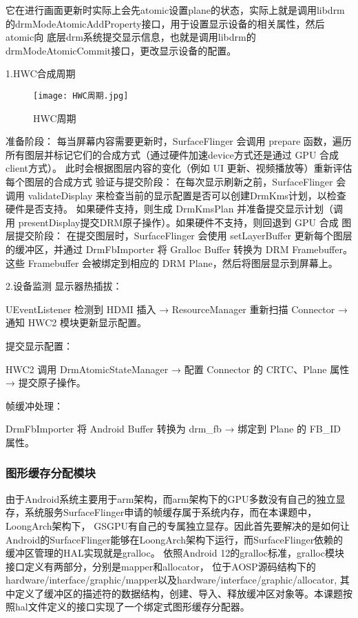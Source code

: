 它在进行画面更新时实际上会先atomic设置plane的状态，实际上就是调用libdrm的drmModeAtomicAddProperty接口，用于设置显示设备的相关属性，然后atomic向
底层drm系统提交显示信息，也就是调用libdrm的drmModeAtomicCommit接口，更改显示设备的配置。

1.HWC合成周期
\begin{figure}[h]
  \centering
  \texttt{[image: HWC周期.jpg]}
  \caption{HWC周期}
  \label{fig:HWC周期}
\end{figure}

准备阶段：
每当屏幕内容需要更新时，SurfaceFlinger 会调用 prepare 函数，遍历所有图层并标记它们的合成方式（通过硬件加速device方式还是通过 GPU 合成client方式）。
此时会根据图层内容的变化（例如 UI 更新、视频播放等）重新评估每个图层的合成方式
验证与提交阶段：
在每次显示刷新之前，SurfaceFlinger 会调用 validateDisplay 来检查当前的显示配置是否可以创建DrmKms计划，以检查硬件是否支持。
如果硬件支持，则生成 DrmKmsPlan 并准备提交显示计划（调用 presentDisplay提交DRM原子操作）。如果硬件不支持，则回退到 GPU 合成
图层提交阶段：
在提交图层时，SurfaceFlinger 会使用 setLayerBuffer 更新每个图层的缓冲区，并通过 DrmFbImporter 将 Gralloc Buffer 转换为 DRM Framebuffer。
这些 Framebuffer 会被绑定到相应的 DRM Plane，然后将图层显示到屏幕上。

2.设备监测
显示器热插拔：

UEventListener 检测到 HDMI 插入 → ResourceManager 重新扫描 Connector → 通知 HWC2 模块更新显示配置。

提交显示配置：

HWC2 调用 DrmAtomicStateManager → 配置 Connector 的 CRTC、Plane 属性 → 提交原子操作。

帧缓冲处理：

DrmFbImporter 将 Android Buffer 转换为 drm\_fb → 绑定到 Plane 的 FB\_ID 属性。


\subsubsection{图形缓存分配模块}
由于Android系统主要用于arm架构，而arm架构下的GPU多数没有自己的独立显存，系统服务SurfaceFlinger申请的帧缓存属于系统内存，而在本课题中，LoongArch架构下，
GSGPU有自己的专属独立显存。因此首先要解决的是如何让Android的SurfaceFlinger能够在LoongArch架构下运行，而SurfaceFlinger依赖的缓冲区管理的HAL实现就是gralloc。
依照Android 12的gralloc标准，gralloc模块接口定义有两部分，分别是mapper和allocator，
位于AOSP源码结构下的hardware/interface/graphic/mapper以及hardware/interface/graphic/allocator,
其中定义了缓冲区的描述符的数据结构，创建、导入、释放缓冲区对象等。本课题按照hal文件定义的接口实现了一个绑定式图形缓存分配器。

